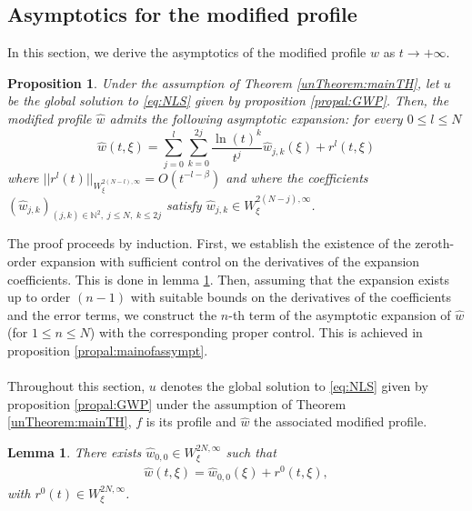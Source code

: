 \documentclass[a4paper, 15pt]{article}
\numberwithin{equation}{section}
\newtheorem{propal}[defi]{Proposition}
\newtheorem{lem}[defi]{Lemma}
\begin{document}
\subsection{Asymptotics for the modified profile}
\label{subsection:asymptoticmodif}
In this section, we derive the asymptotics of the modified profile $\hat{w}$ as $t\to+\infty$.\\
\begin{propal}
\label{propal:bigpropalexpw}
Under the assumption of Theorem \ref{unTheorem:mainTH}, let $u$ be the global solution to \eqref{eq:NLS} given by proposition \ref{propal:GWP}. Then, the modified profile $\hat{w}$ admits the following asymptotic expansion: for every $0\leq l\leq N$
\begin{equation}
    \hat{w}(t,\xi)= \sum^{l}_{j=0}\sum^{2j}_{k=0}\frac{\ln(t)^k}{t^j}\hat{w}_{j,k}(\xi)+r^{l}(t,\xi)
\end{equation}
where $||r^l(t)||_{W^{2(N-l),\infty}_\xi}=O(t^{-l-\beta})$ and where the coefficients $(\hat{w}_{j,k})_{(j,k)\in\mathbb{N}^{2},\;j\leq N,\;k\leq 2j}$ satisfy $\hat{w}_{j,k}\in W^{2(N-j),\infty}_\xi$. 
\end{propal}
The proof proceeds by induction. First, we establish the existence of the zeroth-order expansion with sufficient control on the derivatives of the expansion coefficients. This is done in lemma \ref{lem:mainofbasecase}. Then, assuming that the expansion exists up to order $(n-1)$ with suitable bounds on the derivatives of the coefficients and the error terms, we construct the $n$-th term of the asymptotic expansion of $\hat{w}$ (for $1\leq n\leq N$) with the corresponding proper control. This is achieved in proposition \ref{propal:mainofassympt}. \\\\
Throughout this section, $u$ denotes the global solution to \eqref{eq:NLS} given by proposition \ref{propal:GWP} under the assumption of Theorem \ref{unTheorem:mainTH}, $f$ is its profile and $\hat{w}$ the associated modified profile. \\
\begin{lem}
\label{lem:mainofbasecase}
There exists $\hat{w}_{0,0}\in W^{2N,\infty}_\xi$ such that 
\begin{align}
\hat{w}(t,\xi)=\hat{w}_{0,0}(\xi)+r^0(t,\xi),
\end{align}
with $r^0(t)\in W^{2N,\infty}_\xi$.
\end{lem}
\end{document}
